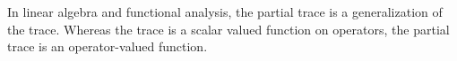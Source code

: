
In linear algebra and functional analysis, the partial trace is a generalization of the trace. 
Whereas the trace is a scalar valued function on operators, the partial trace is an operator-valued function.